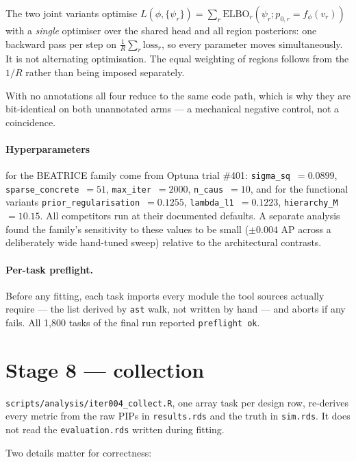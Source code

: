 \documentclass[11pt,a4paper]{article}
\newcommand{\file}[1]{\texttt{\small #1}}
\begin{document}
The two joint variants optimise
$L(\phi,\{\psi_r\})=\sum_r\mathrm{ELBO}_r(\psi_r;p_{0,r}=f_\phi(v_r))$ with a
\emph{single} optimiser over the shared head and all region posteriors: one
backward pass per step on $\tfrac1R\sum_r\mathrm{loss}_r$, so every parameter
moves simultaneously. It is not alternating optimisation. The equal weighting of
regions follows from the $1/R$ rather than being imposed separately.

With no annotations all four reduce to the same code path, which is why they are
bit-identical on both unannotated arms --- a mechanical negative control, not a
coincidence.

\paragraph{Hyperparameters} for the BEATRICE family come from Optuna trial
\#401: \texttt{sigma\_sq}~$=0.0899$, \texttt{sparse\_concrete}~$=51$,
\texttt{max\_iter}~$=2000$, \texttt{n\_caus}~$=10$, and for the functional
variants \texttt{prior\_regularisation}~$=0.1255$,
\texttt{lambda\_l1}~$=0.1223$, \texttt{hierarchy\_M}~$=10.15$. All competitors
run at their documented defaults. A separate analysis found the family's
sensitivity to these values to be small ($\pm0.004$ AP across a deliberately
wide hand-tuned sweep) relative to the architectural contrasts.

\paragraph{Per-task preflight.} Before any fitting, each task imports every
module the tool sources actually require --- the list derived by \texttt{ast}
walk, not written by hand --- and aborts if any fails. All 1{,}800 tasks of the
final run reported \texttt{preflight ok}.

\section{Stage 8 --- collection}

\file{scripts/analysis/iter004\_collect.R}, one array task per design row,
re-derives every metric from the raw PIPs in \file{results.rds} and the truth in
\file{sim.rds}. It does not read the \file{evaluation.rds} written during
fitting.

Two details matter for correctness:
\end{document}
